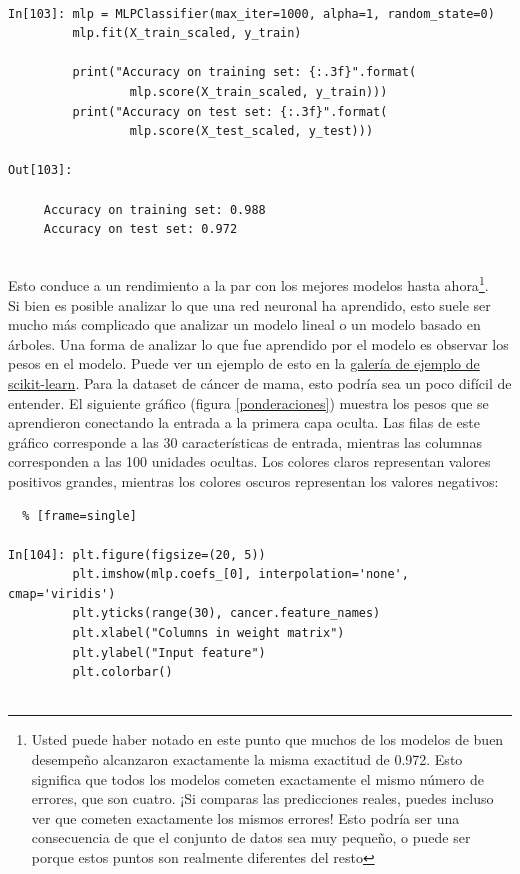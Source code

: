 {\begin{lstlisting}  

In[103]: mlp = MLPClassifier(max_iter=1000, alpha=1, random_state=0)
         mlp.fit(X_train_scaled, y_train)
   
         print("Accuracy on training set: {:.3f}".format(
                 mlp.score(X_train_scaled, y_train)))
         print("Accuracy on test set: {:.3f}".format(
                 mlp.score(X_test_scaled, y_test)))

Out[103]:
     
     Accuracy on training set: 0.988
     Accuracy on test set: 0.972


\end{lstlisting}

Esto conduce a un rendimiento a la par con los mejores modelos hasta ahora{\footnote{\scriptsize{Usted puede haber notado en este punto que muchos de los modelos de buen desempeño alcanzaron exactamente la misma exactitud de 0.972. Esto significa que todos los modelos cometen exactamente el mismo número de errores, que son cuatro. ¡Si comparas las predicciones reales, puedes incluso ver que cometen exactamente los mismos errores! Esto podría ser una consecuencia de que el conjunto de datos sea muy pequeño, o puede ser porque estos puntos son realmente diferentes del resto}}}. \\

Si bien es posible analizar lo que una red neuronal ha aprendido, esto suele ser mucho más complicado que analizar un modelo lineal o un modelo basado en árboles. Una forma de 
analizar lo que fue aprendido por el modelo  es observar los pesos en el modelo.   Puede ver un ejemplo de esto en la  \href{http://scikit-learn.org/stable/auto_examples/neural_networks/plot_mnist_filters.html}{\color{vino}      galería de ejemplo de scikit-learn}.  Para la  dataset de cáncer de mama, esto podría sea un poco difícil de entender. El siguiente gráfico  (figura \ref{ponderaciones}) muestra los pesos que se aprendieron conectando la entrada a la primera capa oculta. Las filas de este gráfico corresponde a las 30 características de entrada,  mientras las columnas  corresponden a las 100 unidades ocultas. Los colores claros representan valores positivos grandes, mientras los colores oscuros representan 
los valores negativos:\\

\begin{lstlisting}  % [frame=single]	

In[104]: plt.figure(figsize=(20, 5))
         plt.imshow(mlp.coefs_[0], interpolation='none', cmap='viridis')
         plt.yticks(range(30), cancer.feature_names)
         plt.xlabel("Columns in weight matrix")
         plt.ylabel("Input feature")
         plt.colorbar()


\end{lstlisting}}
